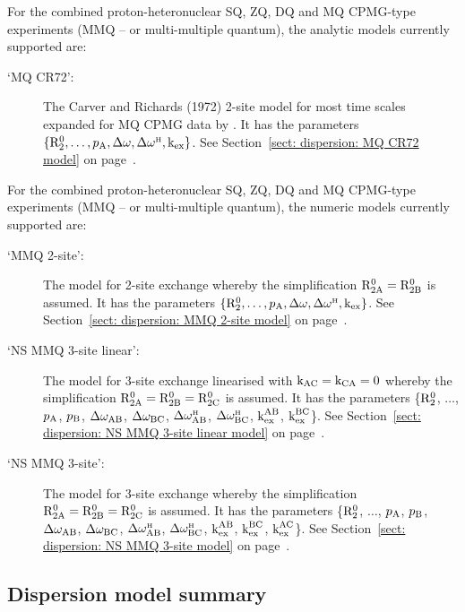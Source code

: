 For the combined proton-heteronuclear SQ, ZQ, DQ and MQ CPMG-type experiments (MMQ -- or multi-multiple quantum), the analytic models currently supported are:

\begin{description}
\item[`MQ CR72':]  The Carver and Richards (1972) 2-site model for most time scales expanded for MQ CPMG data by \citet{Korzhnev04a}.  It has the parameters $\{\mathrm{R}_2^0, \dots, p_\textrm{A}, \Delta\omega, \Delta\omega^{\scriptscriptstyle\mathrm{H}}, \textrm{k}_\textrm{ex}\}$.  See Section~\ref{sect: dispersion: MQ CR72 model} on page~\pageref{sect: dispersion: MQ CR72 model}.
\end{description}


For the combined proton-heteronuclear SQ, ZQ, DQ and MQ CPMG-type experiments (MMQ -- or multi-multiple quantum), the numeric models currently supported are:

\begin{description}
\item[`MMQ 2-site':]  The model for 2-site exchange whereby the simplification $\mathrm{R}_\mathrm{2A}^0 = \mathrm{R}_\mathrm{2B}^0$ is assumed.  It has the parameters $\{\mathrm{R}_2^0, \dots, p_\textrm{A}, \Delta\omega, \Delta\omega^{\scriptscriptstyle\mathrm{H}}, \textrm{k}_\textrm{ex}\}$.  See Section~\ref{sect: dispersion: MMQ 2-site model} on page~\pageref{sect: dispersion: MMQ 2-site model}.
\item[`NS MMQ 3-site linear':]  The model for 3-site exchange linearised with $\textrm{k}_\textrm{AC}=\textrm{k}_\textrm{CA}=0$ whereby the simplification $\mathrm{R}_\mathrm{2A}^0 = \mathrm{R}_\mathrm{2B}^0 = \mathrm{R}_\mathrm{2C}^0$ is assumed.  It has the parameters \{$\mathrm{R}_2^0$, $\dots$, $p_\textrm{A}$, $p_\textrm{B}$, $\Delta\omega_\textrm{AB}$, $\Delta\omega_\textrm{BC}$, $\Delta\omega^{\scriptscriptstyle\mathrm{H}}_\textrm{AB}$, $\Delta\omega^{\scriptscriptstyle\mathrm{H}}_\textrm{BC}$, $\textrm{k}_\textrm{ex}^\textrm{AB}$, $\textrm{k}_\textrm{ex}^\textrm{BC}$\}.  See Section~\ref{sect: dispersion: NS MMQ 3-site linear model} on page~\pageref{sect: dispersion: NS MMQ 3-site linear model}.
\item[`NS MMQ 3-site':]  The model for 3-site exchange whereby the simplification $\mathrm{R}_\mathrm{2A}^0 = \mathrm{R}_\mathrm{2B}^0 = \mathrm{R}_\mathrm{2C}^0$ is assumed.  It has the parameters \{$\mathrm{R}_2^0$, $\dots$, $p_\textrm{A}$, $p_\textrm{B}$, $\Delta\omega_\textrm{AB}$, $\Delta\omega_\textrm{BC}$, $\Delta\omega^{\scriptscriptstyle\mathrm{H}}_\textrm{AB}$, $\Delta\omega^{\scriptscriptstyle\mathrm{H}}_\textrm{BC}$, $\textrm{k}_\textrm{ex}^\textrm{AB}$, $\textrm{k}_\textrm{ex}^\textrm{BC}$, $\textrm{k}_\textrm{ex}^\textrm{AC}$\}.  See Section~\ref{sect: dispersion: NS MMQ 3-site model} on page~\pageref{sect: dispersion: NS MMQ 3-site model}.
\end{description}



\subsection{Dispersion model summary}

